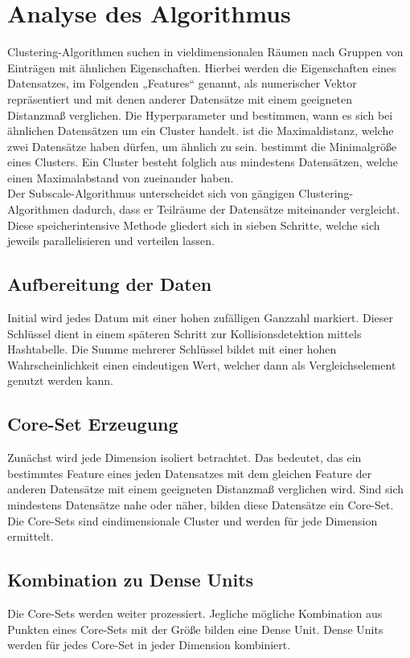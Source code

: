 \section{Analyse des Algorithmus}
Clustering-Algorithmen suchen in vieldimensionalen Räumen nach Gruppen von Einträgen mit ähnlichen Eigenschaften. Hierbei werden die Eigenschaften eines Datensatzes, im Folgenden „Features“ genannt, als numerischer Vektor repräsentiert und mit denen anderer Datensätze mit einem geeigneten Distanzmaß verglichen. Die Hyperparameter \tau und \epsilon bestimmen, wann es sich bei ähnlichen Datensätzen um ein Cluster handelt. \epsilon ist die Maximaldistanz, welche zwei Datensätze haben dürfen, um ähnlich zu sein. \tau bestimmt die Minimalgröße eines Clusters. Ein Cluster besteht folglich aus mindestens \tau Datensätzen, welche einen Maximalabstand von \epsilon zueinander haben.\\
Der Subscale-Algorithmus unterscheidet sich von gängigen Clustering-Algorithmen dadurch, dass er Teilräume der Datensätze miteinander vergleicht. Diese speicherintensive Methode gliedert sich in sieben Schritte, welche sich jeweils parallelisieren und verteilen 
lassen.

\subsection{Aufbereitung der Daten}
Initial wird jedes Datum mit einer hohen zufälligen Ganzzahl markiert. Dieser Schlüssel dient in einem späteren Schritt zur Kollisionsdetektion mittels Hashtabelle. Die Summe mehrerer Schlüssel bildet mit einer hohen Wahrscheinlichkeit einen eindeutigen Wert, 
welcher dann als Vergleichselement genutzt werden kann.

\subsection{Core-Set Erzeugung}
Zunächst wird jede Dimension isoliert betrachtet. Das bedeutet, das ein bestimmtes Feature eines jeden Datensatzes mit dem gleichen Feature der anderen Datensätze mit einem geeigneten Distanzmaß verglichen wird. Sind sich mindestens \tau Datensätze \epsilon nahe oder näher, bilden diese Datensätze ein Core-Set. Die Core-Sets sind eindimensionale Cluster und werden für jede Dimension ermittelt.

\subsection{Kombination zu Dense Units}
Die Core-Sets werden weiter prozessiert. Jegliche mögliche Kombination aus Punkten eines Core-Sets mit der Größe \tau bilden eine Dense Unit. Dense Units werden für jedes Core-Set in jeder Dimension kombiniert.


